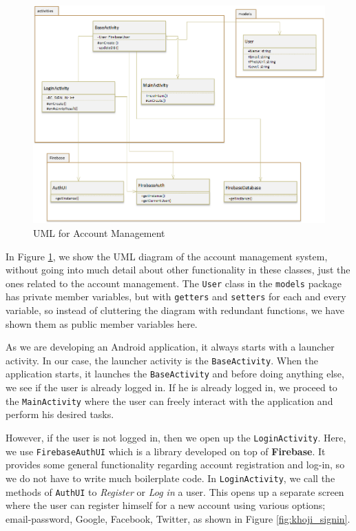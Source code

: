 \begin{figure}[H]
    \centering
        \includegraphics[width=1.00\textwidth]{images/uml-account-login.png}
    \caption{UML for Account Management}
    \label{fig:uml-account-login}
\end{figure}

In Figure \ref{fig:uml-account-login}, we show the UML diagram of the account management system, without going into much detail about other functionality in these classes, just the ones related to the account management. The \texttt{User} class in the \texttt{models} package has private member variables, but with \texttt{getters} and \texttt{setters} for each and every variable, so instead of cluttering the diagram with redundant functions, we have shown them as public member variables here.

As we are developing an Android application, it always starts with a launcher activity. In our case, the launcher activity is the \texttt{BaseActivity}. When the application starts, it launches the \texttt{BaseActivity} and before doing anything else, we see if the user is already logged in. If he is already logged in, we proceed to the \texttt{MainActivity} where the user can freely interact with the application and perform his desired tasks.

However, if the user is not logged in, then we open up the \texttt{LoginActivity}. Here, we use \texttt{FirebaseAuthUI} which is a library developed on top of \textbf{Firebase}. It provides some general functionality regarding account registration and log-in, so we do not have to write much boilerplate code. In \texttt{LoginActivity}, we call the methods of \texttt{AuthUI} to \textit{Register} or \textit{Log in} a user. This opens up a separate screen where the user can register himself for a new account using various options; email-password, Google, Facebook, Twitter, as shown in Figure \ref{fig:khoji_signin}.


